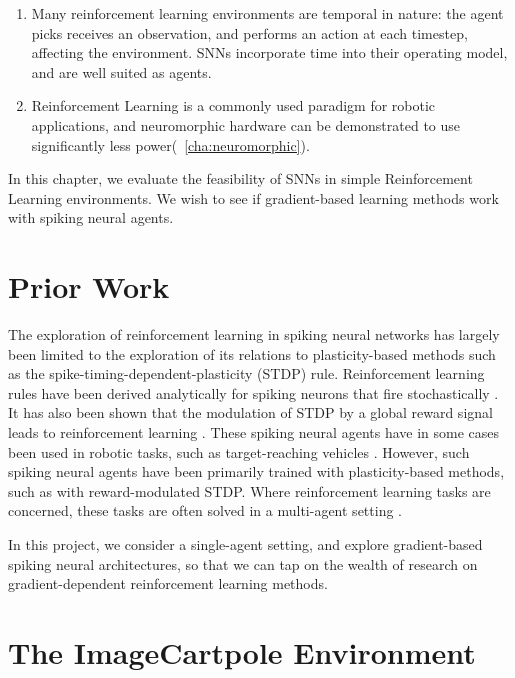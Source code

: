 \documentclass[fyp]{socreport}
\begin{document}
\begin{enumerate}
  \item Many reinforcement learning environments are temporal in nature: the
    agent picks receives an observation, and performs an action at each
    timestep, affecting the environment. SNNs incorporate time into their
    operating model, and are well suited as agents.
  \item Reinforcement Learning is a commonly used paradigm for robotic
    applications, and neuromorphic hardware can be demonstrated to use
    significantly less power(~\autoref{cha:neuromorphic}).
\end{enumerate}

In this chapter, we evaluate the feasibility of SNNs in simple Reinforcement
Learning environments. We wish to see if gradient-based learning methods work
with spiking neural agents.

\section{Prior Work}

The exploration of reinforcement learning in spiking neural networks
has largely been limited to the exploration of its relations to
plasticity-based methods such as the spike-timing-dependent-plasticity
(STDP) rule. Reinforcement learning rules have been derived
analytically for spiking neurons that fire stochastically
\cite{florian2005}. It has also been shown that the modulation of STDP
by a global reward signal leads to reinforcement learning
\cite{florian07_reinf_learn_throug_modul_spike}. These spiking neural
agents have in some cases been used in robotic tasks, such as
target-reaching vehicles \cite{10.3389/fnbot.2019.00018}. However, such
spiking neural agents have been primarily trained with
plasticity-based methods, such as with reward-modulated STDP. Where
reinforcement learning tasks are concerned, these tasks are often
solved in a multi-agent setting
\cite{VITANZA20153122,aenugu19_reinf_learn_with_spikin_coagen}.

In this project, we consider a single-agent setting, and explore
gradient-based spiking neural architectures, so that we can tap on the
wealth of research on gradient-dependent reinforcement learning
methods.

\section{The ImageCartpole Environment}
\end{document}
